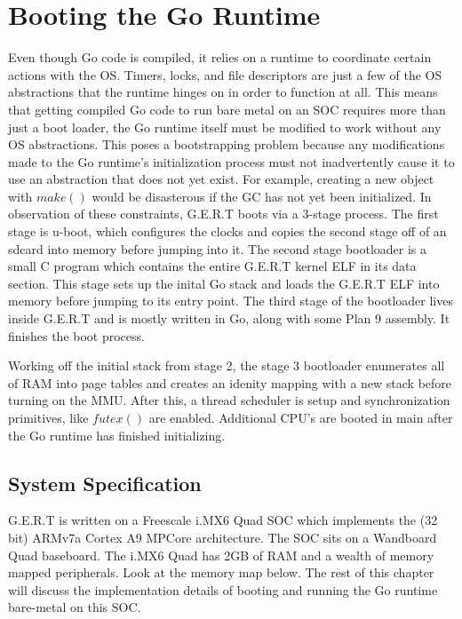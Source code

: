\chapter{Booting the Go Runtime}

Even though Go code is compiled, it relies on a runtime to coordinate certain actions with the OS.
Timers, locks, and file descriptors are just a few of the OS abstractions that the runtime hinges on
in order to function at all. This means that getting compiled Go code to run bare metal on an SOC requires
more than just a boot loader, the Go runtime itself must be modified to work without any OS abstractions.
This poses a bootstrapping problem because any modifications made to the Go runtime's initialization
process must not inadvertently cause it to use an abstraction that does not yet exist. For example,
creating a new object with $make()$ would be disasterous if the GC has not yet been initialized.
In observation of these constraints, G.E.R.T boots via a 3-stage process. The first stage is u-boot, which
configures the clocks and copies the second stage off of an sdcard into memory before jumping into it. The second
stage bootloader is a small C program which contains the entire G.E.R.T kernel ELF in its data section. This stage sets
up the inital Go stack and loads the G.E.R.T ELF into memory before jumping to its entry point. The third stage
of the bootloader lives inside G.E.R.T and is mostly written in Go, along with some Plan 9 assembly. It finishes the
boot process.



Working off the
initial stack from stage 2, the stage 3 bootloader enumerates all of RAM into page tables and creates an idenity mapping
with a new stack before turning on the MMU. After this, a thread scheduler is setup and synchronization primitives, like
$futex()$ are enabled. Additional CPU's are booted in main after the Go runtime has finished initializing.

\section{System Specification}
G.E.R.T is written on a Freescale i.MX6 Quad SOC which implements the (32 bit) ARMv7a Cortex A9 MPCore architecture.
The SOC sits on a Wandboard Quad baseboard. The i.MX6 Quad has 2GB of RAM and a wealth of memory mapped peripherals.
Look at the memory map below. The rest of this chapter will discuss the implementation details of booting and
running the Go runtime bare-metal on this SOC.

